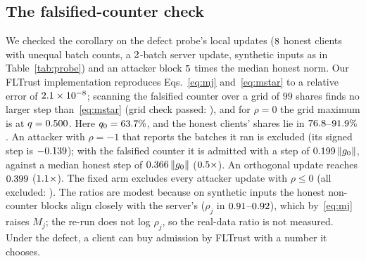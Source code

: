 \documentclass[journal]{IEEEtran}
\begin{document}
\subsection{The falsified-counter check}
\label{sup:falsify}
We checked the corollary on the defect probe's local updates ($8$ honest
clients with unequal batch counts, a $2$-batch server update, synthetic
inputs as in Table~\ref{tab:probe}) and an attacker block $5$ times the
median honest norm. Our FLTrust implementation reproduces Eqs.~\eqref{eq:mj}
and~\eqref{eq:mstar} to a relative error of $2.1\times10^{-8}$; scanning the falsified
counter over a grid of $99$ shares finds no larger step than~\eqref{eq:mstar}
(grid check passed: \ffGridBelow), and for $\rho=0$ the grid maximum is at $q=0.500$. Here
$q_0=63.7\%$, and the honest clients' shares lie in $76.8$--$91.9\%$.
An attacker with $\rho=-1$ that reports the batches it ran is excluded (its signed
step is $-0.139$); with the falsified counter it is admitted with a step of
$0.199\,\|g_0\|$, against a median honest step of $0.366\,\|g_0\|$
($0.5\times$). An orthogonal update reaches $0.399$ ($1.1\times$).
The fixed arm excludes every attacker update with $\rho\le0$ (all excluded: \ffFixedFlagsAll).
The ratios are modest because on synthetic inputs the honest non-counter blocks align
closely with the server's ($\rho_j$ in $0.91$--$0.92$), which by~\eqref{eq:mj} raises
$M_j$; the re-run does not log $\rho_j$, so the real-data ratio is not measured. Under the defect,
a client can buy admission by FLTrust with a number it chooses.
\end{document}
